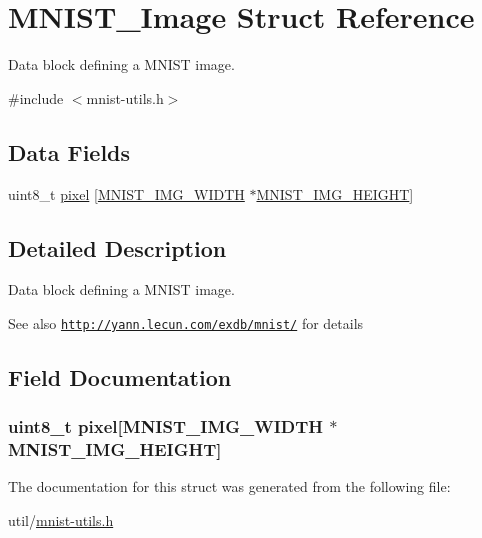 \hypertarget{struct_m_n_i_s_t___image}{}\section{M\+N\+I\+S\+T\+\_\+\+Image Struct Reference}
\label{struct_m_n_i_s_t___image}


Data block defining a M\+N\+I\+S\+T image.  




{\ttfamily \#include $<$mnist-\/utils.\+h$>$}

\subsection*{Data Fields}
\begin{DoxyCompactItemize}
\item 
uint8\+\_\+t \hyperlink{struct_m_n_i_s_t___image_a087aa04709d5619cffc44defd08e8abb}{pixel} \mbox{[}\hyperlink{mnist-utils_8h_afa9a8f034b6b2dbc4f42ec4281cf2082}{M\+N\+I\+S\+T\+\_\+\+I\+M\+G\+\_\+\+W\+I\+D\+T\+H} $\ast$\hyperlink{mnist-utils_8h_a50bba24c079fe75bbae294ba50dbaa32}{M\+N\+I\+S\+T\+\_\+\+I\+M\+G\+\_\+\+H\+E\+I\+G\+H\+T}\mbox{]}
\end{DoxyCompactItemize}


\subsection{Detailed Description}
Data block defining a M\+N\+I\+S\+T image. 

\begin{DoxySeeAlso}{See also}
\href{http://yann.lecun.com/exdb/mnist/}{\tt http\+://yann.\+lecun.\+com/exdb/mnist/} for details 
\end{DoxySeeAlso}


\subsection{Field Documentation}
\hypertarget{struct_m_n_i_s_t___image_a087aa04709d5619cffc44defd08e8abb}{}
\subsubsection[{pixel}]{\setlength{\rightskip}{0pt plus 5cm}uint8\+\_\+t pixel\mbox{[}{\bf M\+N\+I\+S\+T\+\_\+\+I\+M\+G\+\_\+\+W\+I\+D\+T\+H} $\ast${\bf M\+N\+I\+S\+T\+\_\+\+I\+M\+G\+\_\+\+H\+E\+I\+G\+H\+T}\mbox{]}}\label{struct_m_n_i_s_t___image_a087aa04709d5619cffc44defd08e8abb}


The documentation for this struct was generated from the following file\+:\begin{DoxyCompactItemize}
\item 
util/\hyperlink{mnist-utils_8h}{mnist-\/utils.\+h}\end{DoxyCompactItemize}
